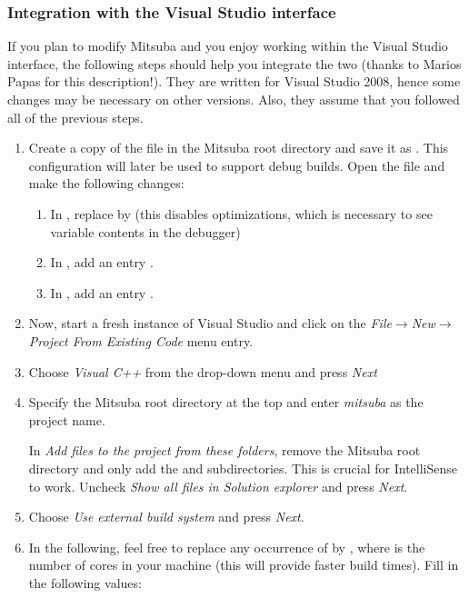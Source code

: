 \subsubsection{Integration with the Visual Studio interface}
If you plan to modify Mitsuba and you enjoy working within the Visual
Studio interface, the following steps should help you integrate the two
(thanks to Marios Papas for this description!). They are written for Visual Studio 2008,
hence some changes may be necessary on other versions. Also, they assume
that you followed all of the previous steps.

\begin{enumerate}
\item Create a copy of the file  in the Mitsuba root directory and
save it as . This configuration 
will later be used to support debug
builds. Open the file and make the following changes:
\begin{enumerate}
\item In , replace  by  (this disables
optimizations, which is necessary to see variable contents in the debugger)
\item In , add an entry .
\item In , add an entry .
\end{enumerate}
\item Now, start a fresh instance of Visual Studio and click on 
the \emph{File$\to$New$\to$Project From Existing Code} menu entry.
\item Choose \emph{Visual C++} from the drop-down menu and press \emph{Next}
\item Specify the Mitsuba root directory at the top and enter \emph{mitsuba}
as the project name. 

In \emph{Add files to the project from these folders}, remove the Mitsuba 
root directory and only add the  and  subdirectories. 
This is crucial for IntelliSense to work.
Uncheck \emph{Show all files in Solution explorer} and
press \emph{Next}.
\item Choose \emph{Use external build system} and press \emph{Next}.
\item In the following, feel free to replace any occurrence of
 by , where  is the number of
cores in your machine (this will provide faster build times). 
Fill in the following values:


\end{enumerate}
